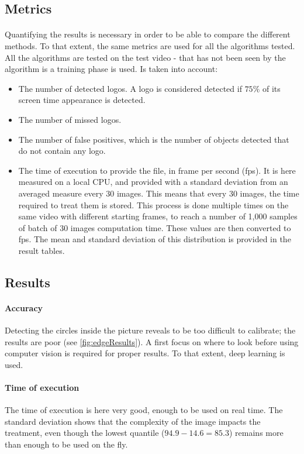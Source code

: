 \documentclass[12pt]{article}%
\begin{document}
\subsection{Metrics}

\paragraph{}
Quantifying the results is necessary in order to be able to compare the different methods. To that extent, the same metrics are used for all the algorithms tested. All the algorithms are tested on the test video - that has not been seen by the algorithm is a training phase is used. Is taken into account:
\begin{itemize}
    \item The number of detected logos. A logo is considered detected if $75\%$ of its screen time appearance is detected.
    \item The number of missed logos.
    \item The number of false positives, which is the number of objects detected that do not contain any logo.
    \item The time of execution to provide the  file, in frame per second (fps). It is here measured on a local CPU, and provided with a standard deviation from an averaged measure every 30 images. This means that every 30 images, the time required to treat them is stored. This process is done multiple times on the same video with different starting frames, to reach a number of 1,000 samples of batch of 30 images computation time. These values are then converted to fps. The mean and standard deviation of this distribution is provided in the result tables.
\end{itemize}


\subsection{Results}
\paragraph{Accuracy}
Detecting the circles inside the picture reveals to be too difficult to calibrate; the results are poor (see \ref{fig:edgeResults}). A first focus on where to look before using computer vision is required for proper results. To that extent, deep learning is used.

\paragraph{Time of execution}
The time of execution is here very good, enough to be used on real time. The standard deviation shows that the complexity of the image impacts the treatment, even though the lowest quantile ($94.9 - 14.6 = 85.3$) remains more than enough to be used on the fly.
\end{document}
